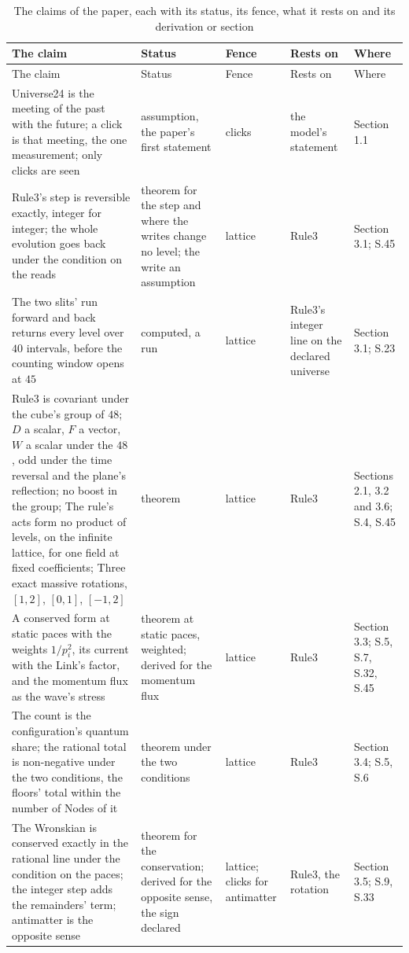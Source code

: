 \documentclass[pdflatex,sn-mathphys-num]{sn-jnl}
\theoremstyle{thmstyleone}
\begin{document}
\begin{footnotesize}\setlength{\tabcolsep}{3pt}\begin{longtable}{L{4.3cm}L{2.4cm}L{1.2cm}L{2.0cm}L{2.0cm}}
\caption{\label{tab:claims}The claims of the paper, each with its status, its fence, what it rests on and its derivation or section}\\
\toprule
The claim & Status & Fence & Rests on & Where\\
\midrule
\endfirsthead
\toprule
The claim & Status & Fence & Rests on & Where\\
\midrule
\endhead
\bottomrule
\endfoot
Universe24 is the meeting of the past with the future; a click is that meeting, the one measurement; only clicks are seen & assumption, the paper's first statement & clicks & the model's statement & Section 1.1\\
Rule3's step is reversible exactly, integer for integer; the whole evolution goes back under the condition on the reads & theorem for the step and where the writes change no level; the write an assumption & lattice & Rule3 & Section 3.1; S.45\\
The two slits' run forward and back returns every level over $40$ intervals, before the counting window opens at $45$ & computed, a run & lattice & Rule3's integer line on the declared universe & Section 3.1; S.23\\
Rule3 is covariant under the cube's group of $48$; $D$ a scalar, $F$ a vector, $W$ a scalar under the $48$, odd under the time reversal and the plane's reflection; no boost in the group; The rule's acts form no product of levels, on the infinite lattice, for one field at fixed coefficients; Three exact massive rotations, $[1, 2]$, $[0, 1]$, $[-1, 2]$ & theorem & lattice & Rule3 & Sections 2.1, 3.2 and 3.6; S.4, S.45\\
A conserved form at static paces with the weights $1 / p_i^2$, its current with the Link's factor, and the momentum flux as the wave's stress & theorem at static paces, weighted; derived for the momentum flux & lattice & Rule3 & Section 3.3; S.5, S.7, S.32, S.45\\
The count is the configuration's quantum share; the rational total is non-negative under the two conditions, the floors' total within the number of Nodes of it & theorem under the two conditions & lattice & Rule3 & Section 3.4; S.5, S.6\\
The Wronskian is conserved exactly in the rational line under the condition on the paces; the integer step adds the remainders' term; antimatter is the opposite sense & theorem for the conservation; derived for the opposite sense, the sign declared & lattice; clicks for antimatter & Rule3, the rotation & Section 3.5; S.9, S.33\\

\end{longtable}
\end{footnotesize}
\end{document}
